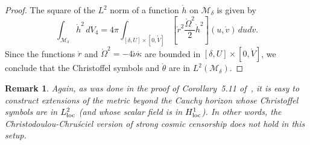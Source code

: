 \documentclass[a4paper,11pt,oneside,reqno]{amsart}
\newtheorem{Rmk}[Thm]{Remark}
\newcommand{\cal}{\mathcal}
\newcommand{\mrpp}{\mathring}
\begin{document}
\begin{proof}
The square of the $L^2$ norm of a function $\mrpp h$ on ${\cal M}_\delta$ is given by
$$
\int_{{\cal M}_\delta}{\mrpp h}^2\,dV_4=4\pi\int_{[\delta,U]\times[0,\mrpp{V}]}\left[\mrpp r^2\frac{\mrpp\Omega^2}2\mrpp h^2\right](u,\mrpp v)\,dud\mrpp v.
$$
Since the functions $\mrpp r$ and $\mrpp\Omega^2=-4\mrpp\nu\mrpp\kappa$ are bounded in $[\delta,U]\times[0,\mrpp{V}]$, we conclude that the Christoffel symbols and $\mrpp\theta$ are in $L^2({\cal M}_\delta)$.
\end{proof}

\begin{Rmk}
Again, as was done in the proof of
{\rm Corollary~5.11} of\/~{\rm \cite{relIst3}}, it is easy to construct extensions of the metric beyond the Cauchy horizon whose Christoffel symbols are in $L^2_{{\rm loc}}$ (and whose scalar field is in $H^1_{{\rm loc}}$). In other words, the Christodoulou-Chru\'sciel version of strong cosmic censorship does not hold in this setup.
\end{Rmk}
\end{document}
